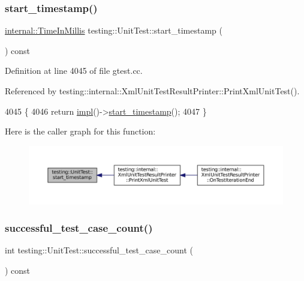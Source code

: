 \subsubsection{\texorpdfstring{start\+\_\+timestamp()}{start\_timestamp()}}
{\footnotesize\ttfamily \hyperlink{namespacetesting_1_1internal_a66a845df404b38fe85c5e14a069f255a}{internal\+::\+Time\+In\+Millis} testing\+::\+Unit\+Test\+::start\+\_\+timestamp (\begin{DoxyParamCaption}{ }\end{DoxyParamCaption}) const}



Definition at line 4045 of file gtest.\+cc.



Referenced by testing\+::internal\+::\+Xml\+Unit\+Test\+Result\+Printer\+::\+Print\+Xml\+Unit\+Test().


\begin{DoxyCode}
4045                                                      \{
4046     \textcolor{keywordflow}{return} \hyperlink{classtesting_1_1UnitTest_a4df5d11a58affb337d7fa62eaa07690e}{impl}()->\hyperlink{classtesting_1_1internal_1_1UnitTestImpl_abb02dfd689760c6323acec725d9631d5}{start\_timestamp}();
4047 \}
\end{DoxyCode}
Here is the caller graph for this function\+:
\nopagebreak
\begin{figure}[H]
\begin{center}
\leavevmode
\includegraphics[width=350pt]{classtesting_1_1UnitTest_a3d83fe1cc5570a1c34f9754b0f56d65f_icgraph}
\end{center}
\end{figure}
\mbox{\label{classtesting_1_1UnitTest_acaa2ab71f53c25ffe0242a91c14e173f}} 
\subsubsection{\texorpdfstring{successful\+\_\+test\+\_\+case\+\_\+count()}{successful\_test\_case\_count()}}
{\footnotesize\ttfamily int testing\+::\+Unit\+Test\+::successful\+\_\+test\+\_\+case\+\_\+count (\begin{DoxyParamCaption}{ }\end{DoxyParamCaption}) const}



